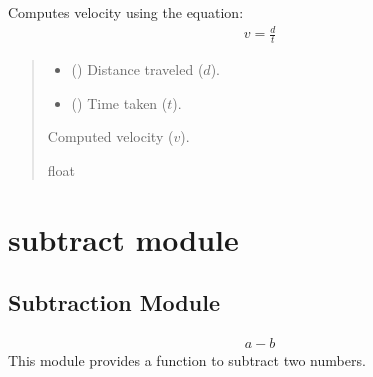 \documentclass[a4paper,14pt,oneside,english,openany]{sphinxmanual}
\begin{document}
\begin{fulllineitems}
\label{\detokenize{pythagorus:pythagorus.velocity}}
\pysigstartsignatures
{}
\pysigstopsignatures
\sphinxAtStartPar
Computes velocity using the equation:
\begin{equation*}
\begin{split}v =\frac{d}{t}\end{split}
\end{equation*}\begin{quote}\begin{description}
\begin{itemize}
\item {} 
\sphinxAtStartPar
{} () \textendash{} Distance traveled (\(d\)).

\item {} 
\sphinxAtStartPar
{} () \textendash{} Time taken (\(t\)).

\end{itemize}

\sphinxAtStartPar
Computed velocity (\(v\)).

\sphinxAtStartPar
float

\end{description}\end{quote}

\end{fulllineitems}


\sphinxstepscope


\section{subtract module}
\label{\detokenize{subtract:module-subtract}}\label{\detokenize{subtract:subtract-module}}\label{\detokenize{subtract::doc}}

\subsection{Subtraction Module}
\label{\detokenize{subtract:subtraction-module}}\begin{equation*}
\begin{split}a - b\end{split}
\end{equation*}
\sphinxAtStartPar
This module provides a function to subtract two numbers.
\end{document}

